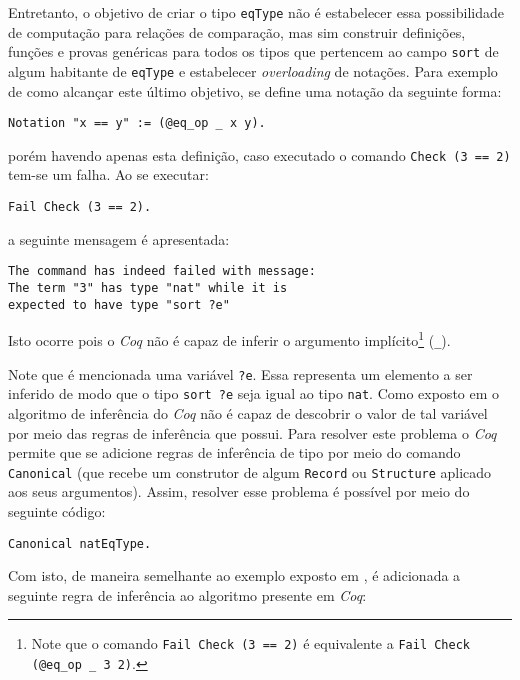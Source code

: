 Entretanto, o objetivo de criar o tipo \lstinline[language = coq]$eqType$ não é estabelecer essa possibilidade de computação para relações de comparação, mas sim construir definições, funções e provas genéricas para todos os tipos que pertencem ao campo \lstinline[language = coq]$sort$ de algum habitante de \lstinline[language = coq]$eqType$ e estabelecer \textit{overloading} de notações. Para exemplo de como alcançar este último objetivo, se define uma notação da seguinte forma:

    \begin{lstlisting}[language=coq,frame=single,tabsize=1]
Notation "x == y" := (@eq_op _ x y).
    \end{lstlisting}
porém havendo apenas esta definição, caso executado o comando \lstinline[language = coq]$Check (3 == 2)$ tem-se um falha. Ao se executar:
    \begin{lstlisting}[language=coq,frame=single,tabsize=1]
Fail Check (3 == 2).
    \end{lstlisting}
a seguinte mensagem é apresentada:
    \begin{lstlisting}[language=coq-error,frame=single,tabsize=1]
The command has indeed failed with message:
The term "3" has type "nat" while it is 
expected to have type "sort ?e"
    \end{lstlisting}
Isto ocorre pois o \textit{Coq} não é capaz de inferir o argumento implícito\footnote{Note que o comando \lstinline[language = coq]$Fail Check (3 == 2)$ é equivalente a \lstinline[language = coq]$Fail Check (@eq_op _ 3 2)$.}  (\lstinline[language = coq]$_$).

Note que é mencionada uma variável \lstinline[language = coq]$?e$. Essa representa um elemento a ser inferido de modo que o tipo \lstinline[language = coq]$sort ?e$ seja igual ao tipo \lstinline[language = coq]$nat$. Como exposto em \cite{10.1007/978-3-642-39634-2_5} o algoritmo de inferência do \textit{Coq} não é capaz de descobrir o valor de tal variável por meio das regras de inferência que possui. Para resolver este problema 
o \textit{Coq} permite que se adicione regras de inferência de tipo por meio do comando \lstinline[language = coq]$Canonical$ (que recebe um construtor de algum \lstinline[language = coq]$Record$ ou \lstinline[language = coq]$Structure$ aplicado aos seus argumentos). Assim, resolver esse problema é possível por meio do seguinte código:
    \begin{lstlisting}[language=coq,frame=single,tabsize=1]
Canonical natEqType.
    \end{lstlisting}
Com isto, de maneira semelhante ao exemplo exposto em \cite{10.1007/978-3-642-39634-2_5}, é adicionada a seguinte regra de inferência ao algoritmo presente em \textit{Coq}:

